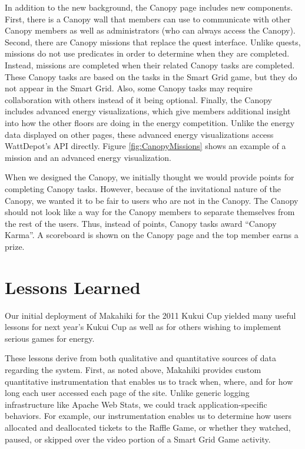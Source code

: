 \documentclass{acm_proc_article-sp}
\begin{document}
In addition to the new background, the Canopy page includes new components. First, there is a Canopy wall that members can use to communicate with other Canopy members as well as administrators (who can always access the Canopy). Second, there are Canopy missions that replace the quest interface. Unlike quests, missions do not use predicates in order to determine when they are completed. Instead, missions are completed when their related Canopy tasks are completed. These Canopy tasks are based on the tasks in the Smart Grid game, but they do not appear in the Smart Grid. Also, some Canopy tasks may require collaboration with others instead of it being optional. Finally, the Canopy includes advanced energy visualizations, which give members additional insight into how the other floors are doing in the energy competition. Unlike the energy data displayed on other pages, these advanced energy visualizations access WattDepot's API directly. Figure \ref{fig:CanopyMissions} shows an example of a mission and an advanced energy visualization.

When we designed the Canopy, we initially thought we would provide points for completing Canopy tasks. However, because of the invitational nature of the Canopy, we wanted it to be fair to users who are not in the Canopy. The Canopy should not look like a way for the Canopy members to separate themselves from the rest of the users. Thus, instead of points, Canopy tasks award ``Canopy Karma''. A scoreboard is shown on the Canopy page and the top member earns a prize.

\section{Lessons Learned}

Our initial deployment of Makahiki for the 2011 Kukui Cup yielded many
useful lessons for next year's Kukui Cup as well as for others wishing to
implement serious games for energy. 

These lessons derive from both qualitative and quantitative sources of data
regarding the system.  First, as noted above, Makahiki provides custom quantitative
instrumentation that enables us to track when, where, and for how long each
user accessed each page of the site.  Unlike generic logging infrastructure
like Apache Web Stats, we could track application-specific behaviors. For
example, our instrumentation enables us to determine how users allocated
and deallocated tickets to the Raffle Game, or whether they watched,
paused, or skipped over the video portion of a Smart Grid Game activity.
\end{document}
